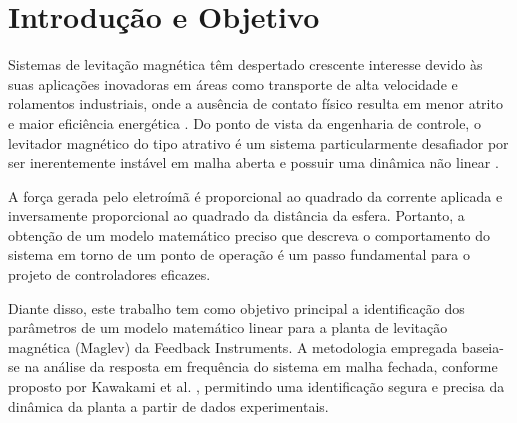 \section{Introdução e Objetivo}

Sistemas de levitação magnética têm despertado crescente interesse devido às suas aplicações inovadoras em áreas como transporte de alta velocidade e rolamentos industriais, onde a ausência de contato físico resulta em menor atrito e maior eficiência energética \cite{kawakami2003,feedback2006control}. Do ponto de vista da engenharia de controle, o levitador magnético do tipo atrativo é um sistema particularmente desafiador por ser inerentemente instável em malha aberta e possuir uma dinâmica não linear \cite{kawakami2003}.

A força gerada pelo eletroímã é proporcional ao quadrado da corrente aplicada e inversamente proporcional ao quadrado da distância da esfera. Portanto, a obtenção de um modelo matemático preciso que descreva o comportamento do sistema em torno de um ponto de operação é um passo fundamental para o projeto de controladores eficazes.

Diante disso, este trabalho tem como objetivo principal a identificação dos parâmetros de um modelo matemático linear para a planta de levitação magnética (Maglev) da Feedback Instruments. A metodologia empregada baseia-se na análise da resposta em frequência do sistema em malha fechada, conforme proposto por Kawakami et al. \cite{kawakami2003}, permitindo uma identificação segura e precisa da dinâmica da planta a partir de dados experimentais.